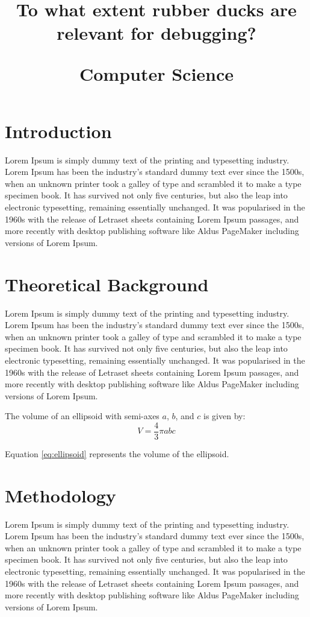 \documentclass[12pt]{article}
\title{
    \begin{Huge}
        To what extent rubber ducks are relevant for debugging? \\
    \end{Huge}
    \vspace{50pt}
    \begin{Large}
        Computer Science \\
    \end{Large}
    \vspace{50pt}
}
\date{
    \begin{normalsize}
        Candidate Number: da42hg \\
        Word count: 4000 \\
    \end{normalsize}
}
\begin{document}
    \maketitle

    \newpage
    \tableofcontents

    \newpage
    \section{Introduction}
    Lorem Ipsum is simply dummy text of the printing and typesetting industry. Lorem Ipsum has been the industry's standard dummy text ever since the 1500s, when an unknown printer took a galley of type and scrambled it to make a type specimen book. It has survived not only five centuries, but also the leap into electronic typesetting, remaining essentially unchanged. It was popularised in the 1960s with the release of Letraset sheets containing Lorem Ipsum passages, and more recently with desktop publishing software like Aldus PageMaker including versions of Lorem Ipsum.

    \newpage
    \section{Theoretical Background}
    Lorem Ipsum is simply dummy text of the printing and \cite{zebracki2017cybergeography} typesetting industry. Lorem Ipsum has been the industry's standard dummy text ever since the 1500s, when an unknown printer took a galley of type and scrambled it to make a type specimen book. It has survived not only five centuries, but also the leap into electronic typesetting, remaining essentially unchanged. It was popularised in the 1960s with the release of Letraset sheets containing Lorem Ipsum passages, and more recently with desktop publishing software like Aldus PageMaker including versions of Lorem Ipsum.

    The volume of an ellipsoid with semi-axes $a$, $b$, and $c$ is given by:
    \begin{equation}\label{eq:ellipsoid}
    V = \frac{4}{3} \pi abc
    \end{equation}

    Equation \eqref{eq:ellipsoid} represents the volume of the ellipsoid.

    \newpage
    \section{Methodology}
    Lorem Ipsum is simply dummy text of the printing and typesetting industry. Lorem Ipsum has been the industry's standard dummy text ever since the 1500s, when an unknown printer took a galley of type and scrambled it to make a type specimen book. It has survived not only five centuries, but also the leap into electronic typesetting, remaining essentially unchanged. It was popularised in the 1960s with the release of Letraset sheets containing Lorem Ipsum passages, and more recently with desktop publishing software like Aldus PageMaker including versions of Lorem Ipsum.
\end{document}
